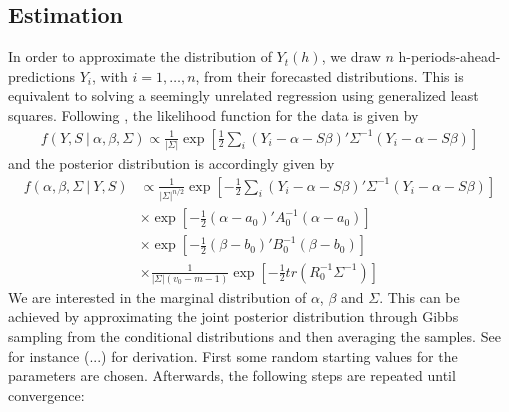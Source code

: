 \documentclass[a4paper,fleqn,11pt]{article}
\begin{document}
\subsection{Estimation}
In order to approximate the distribution of $Y_t(h)$, we draw $n$ h-periods-ahead-predictions $Y_i$, with $i = 1, \hdots, n$, from their forecasted distributions. This is equivalent to solving a seemingly unrelated regression using generalized least squares. Following \cite{Greenberg2008}, the likelihood function for the data is given by 
\begin{align*}
f(Y,S\ |\ \alpha,\beta,\Sigma) \propto \frac{1}{|\Sigma|}\exp\left[\frac{1}{2} \sum_i (Y_i - \alpha - S\beta)'\Sigma^{-1}(Y_i - \alpha - S\beta)\right]
\end{align*}
and the posterior distribution is accordingly given by
\begin{align*}
f(\alpha,\beta,\Sigma\ |\ Y,S) & \propto \frac{1}{|\Sigma|^{n/2}}\exp\left[-\frac{1}{2} \sum_i (Y_i - \alpha - S\beta)'\Sigma^{-1}(Y_i - \alpha - S\beta)\right] \\
&\times \exp \left[-\frac{1}{2}(\alpha - a_0)'A_0^{-1}(\alpha - a_0)\right] \\
&\times \exp \left[-\frac{1}{2}(\beta - b_0)'B_0^{-1}(\beta - b_0)\right] \\
&\times \frac{1}{|\Sigma|(v_0 - m - 1)} \exp \left[-\frac{1}{2} tr(R_0^{-1}\Sigma^{-1}) \right]
\end{align*}
We are interested in the marginal distribution of $\alpha$, $\beta$ and $\Sigma$. This can be achieved by approximating the joint posterior distribution through Gibbs sampling from the conditional distributions and then averaging the samples. See for instance \cite{Kim1999} (...) for derivation. First some random starting values for the parameters are chosen. Afterwards, the following steps are repeated until convergence:
\end{document}
